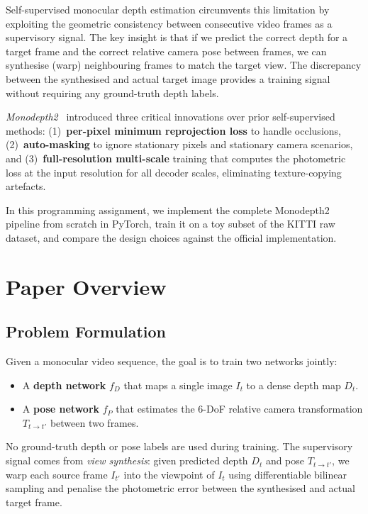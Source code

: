 \documentclass[10pt, a4paper, twocolumn]{article}
\begin{document}
Self-supervised monocular depth estimation circumvents this limitation by exploiting the geometric consistency between consecutive video frames as a supervisory signal. The key insight is that if we predict the correct depth for a target frame and the correct relative camera pose between frames, we can synthesise (warp) neighbouring frames to match the target view. The discrepancy between the synthesised and actual target image provides a training signal without requiring any ground-truth depth labels.

\emph{Monodepth2}~\cite{godard2019digging} introduced three critical innovations over prior self-supervised methods: (1)~\textbf{per-pixel minimum reprojection loss} to handle occlusions, (2)~\textbf{auto-masking} to ignore stationary pixels and stationary camera scenarios, and (3)~\textbf{full-resolution multi-scale} training that computes the photometric loss at the input resolution for all decoder scales, eliminating texture-copying artefacts.

In this programming assignment, we implement the complete Monodepth2 pipeline from scratch in PyTorch, train it on a toy subset of the KITTI raw dataset, and compare the design choices against the official implementation.

\section{Paper Overview}
\label{sec:paper}

\subsection{Problem Formulation}

Given a monocular video sequence, the goal is to train two networks jointly:
\begin{itemize}[noitemsep]
    \item A \textbf{depth network} $f_D$ that maps a single image $I_t$ to a dense depth map $D_t$.
    \item A \textbf{pose network} $f_P$ that estimates the 6-DoF relative camera transformation $T_{t \to t'}$ between two frames.
\end{itemize}

No ground-truth depth or pose labels are used during training. The supervisory signal comes from \emph{view synthesis}: given predicted depth $D_t$ and pose $T_{t \to t'}$, we warp each source frame $I_{t'}$ into the viewpoint of $I_t$ using differentiable bilinear sampling and penalise the photometric error between the synthesised and actual target frame.
\end{document}

